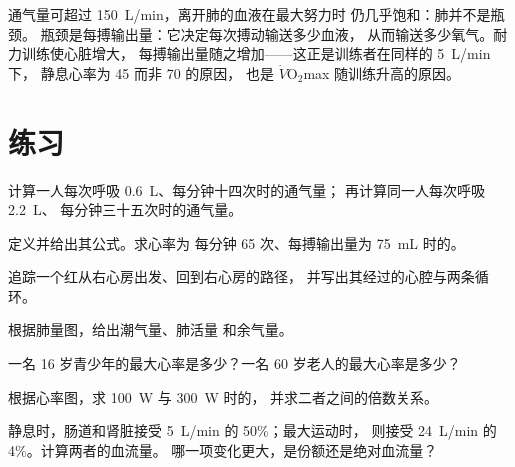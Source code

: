 \begin{remark}[极限在哪里]\label{rem:g10:heart-lungs-effort:limit}
通气量可超过 \qty{150}{L/min}，离开肺的血液在最大努力时
仍几乎饱和：肺并不是瓶颈。
瓶颈是每搏输出量：它决定每次搏动输送多少血液，
从而输送多少氧气。耐力训练使心脏增大，
每搏输出量随之增加——这正是训练者在同样的 \qty{5}{L/min} 下，
静息心率为 45 而非 70 的原因，
也是 $\dot V\!\mathrm{O_2}$max 随训练升高的原因。
\end{remark}

\section{练习}

\begin{exercise}[$\star$]\label{exo:g10:heart-lungs-effort:1}
计算一人每次呼吸 \qty{0.6}{L}、每分钟十四次时的通气量；
再计算同一人每次呼吸 \qty{2.2}{L}、
每分钟三十五次时的通气量。
\end{exercise}

\begin{exercise}[$\star$]\label{exo:g10:heart-lungs-effort:2}
定义并给出其公式。求心率为
每分钟 65 次、每搏输出量为 \qty{75}{mL} 时的。
\end{exercise}

\begin{exercise}[$\star$]\label{exo:g10:heart-lungs-effort:3}
追踪一个红从右心房出发、回到右心房的路径，
并写出其经过的心腔与两条循环。
\end{exercise}

\begin{exercise}[$\star$]\label{exo:g10:heart-lungs-effort:4}
根据肺量图，给出潮气量、肺活量
和余气量。
\end{exercise}

\begin{exercise}[$\star$]\label{exo:g10:heart-lungs-effort:5}
一名 16 岁青少年的最大心率是多少？一名 60 岁老人的最大心率是多少？
\end{exercise}

\begin{exercise}[$\star\star$]\label{exo:g10:heart-lungs-effort:6}
根据心率图，求 \qty{100}{W} 与 \qty{300}{W} 时的，
并求二者之间的倍数关系。
\end{exercise}

\begin{exercise}[$\star\star$]\label{exo:g10:heart-lungs-effort:7}
静息时，肠道和肾脏接受 \qty{5}{L/min} 的 50\%；最大运动时，
则接受 \qty{24}{L/min} 的 4\%。计算两者的血流量。
哪一项变化更大，是份额还是绝对血流量？
\end{exercise}

